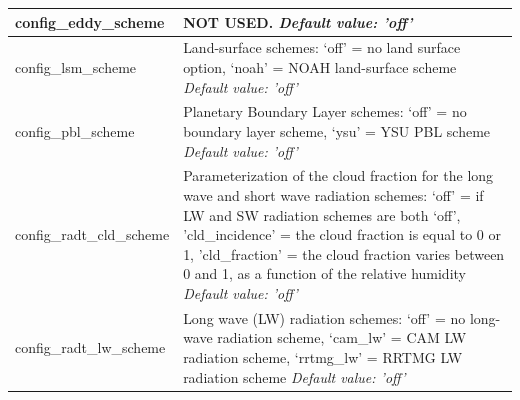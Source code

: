 \documentclass[11pt]{report}
\begin{document}
{\begin{longtable}{|p{2.0in} |p{4.25in}|}
  config\_eddy\_scheme & NOT USED. \newline 
  {\em Default value: 'off'} \\ \hline

  config\_lsm\_scheme & Land-surface schemes: \newline
                                             `off' = no land surface option, \newline
                                             `noah' = NOAH land-surface scheme \newline                                              
  {\em Default value: 'off'} \\ \hline

  config\_pbl\_scheme & Planetary Boundary Layer schemes: \newline
                                             `off' = no boundary layer scheme, \newline
                                             `ysu' = YSU PBL scheme \newline 
  {\em Default value: 'off'} \\ \hline

  config\_radt\_cld\_scheme & Parameterization of the cloud fraction for the long wave and short wave radiation schemes: \newline
                                              `off' = if LW and SW radiation schemes are both `off', \newline
                                              'cld\_incidence' = the cloud fraction is equal to 0 or 1, \newline
                                              'cld\_fraction' = the cloud fraction varies between 0 and 1,  as a function of the relative humidity \newline
   {\em Default value: 'off'} \\ \hline

  config\_radt\_lw\_scheme & Long wave (LW) radiation schemes: \newline
                                             `off' = no long-wave radiation scheme, \newline
                                             `cam\_lw' = CAM LW radiation scheme, \newline 
                                             `rrtmg\_lw' = RRTMG LW radiation scheme \newline
  {\em Default value: 'off'} \\ \hline


\end{longtable}}
\end{document}

